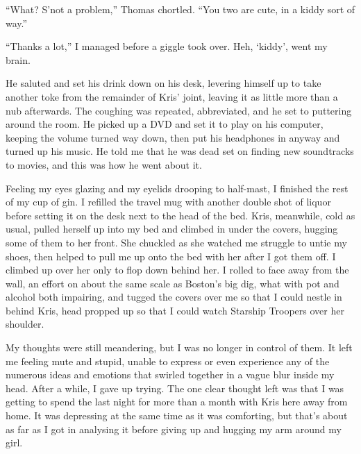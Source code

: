 ``What?  S'not a problem,'' Thomas chortled.  ``You two are cute, in a kiddy sort of way.''

``Thanks a lot,'' I managed before a giggle took over.  Heh, `kiddy', went my brain.

He saluted and set his drink down on his desk, levering himself up to take another toke from the remainder of Kris' joint, leaving it as little more than a nub afterwards.  The coughing was repeated, abbreviated, and he set to puttering around the room.  He picked up a DVD and set it to play on his computer, keeping the volume turned way down, then put his headphones in anyway and turned up his music.  He told me that he was dead set on finding new soundtracks to movies, and this was how he went about it.

Feeling my eyes glazing and my eyelids drooping to half-mast, I finished the rest of my cup of gin.  I refilled the travel mug with another double shot of liquor before setting it on the desk next to the head of the bed.  Kris, meanwhile, cold as usual, pulled herself up into my bed and climbed in under the covers, hugging some of them to her front.  She chuckled as she watched me struggle to untie my shoes, then helped to pull me up onto the bed with her after I got them off.  I climbed up over her only to flop down behind her.  I rolled to face away from the wall, an effort on about the same scale as Boston's big dig, what with pot and alcohol both impairing, and tugged the covers over me so that I could nestle in behind Kris, head propped up so that I could watch Starship Troopers over her shoulder.

My thoughts were still meandering, but I was no longer in control of them.  It left me feeling mute and stupid, unable to express or even experience any of the numerous ideas and emotions that swirled together in a vague blur inside my head.  After a while, I gave up trying.  The one clear thought left was that I was getting to spend the last night for more than a month with Kris here away from home.  It was depressing at the same time as it was comforting, but that's about as far as I got in analysing it before giving up and hugging my arm around my girl.
